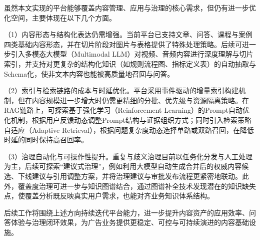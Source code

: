 虽然本文实现的平台能够覆盖内容管理、应用与治理的核心需求，但仍有进一步优化空间，主要体现在以下几个方面。

（1）内容形态与结构化表达仍需增强。当前平台已支持文章、问答、课程与案例四类基础内容形态，并在切片阶段对图片与表格提供了特殊处理策略。后续可进一步引入多模态大模型（Multimodal LLM）对视频、音频内容进行深度理解与切片索引，并支持对更复杂的结构化知识（如规则流程图、指标定义表）的自动抽取与Schema化，使非文本内容也能被高质量地召回与问答。

（2）索引与检索链路的成本与时延优化。平台采用事件驱动的增量索引构建机制，但在内容规模进一步增大时仍需更精细的分批、优先级与资源隔离策略。在RAG链路上，可探索基于强化学习（Reinforcement Learning）的Prompt自动优化机制，根据用户反馈动态调整Prompt结构与证据组织方式；同时引入检索策略自适应（Adaptive Retrieval），根据问题复杂度动态选择单路或双路召回，在降低时延的同时保持高召回率。



（3）治理自动化与可操作性提升。重复与歧义治理目前以任务化分发与人工处理为主，后续可探索“建议式治理”，例如利用大模型自动生成合并后的权威内容候选、下线建议与引用调整方案，并将治理建议与审批发布流程更紧密地联动。此外，覆盖度治理可进一步与知识图谱结合，通过图谱补全技术发现潜在的知识缺失点，使覆盖分析既反映真实用户需求，也能对齐业务知识体系结构。

后续工作将围绕上述方向持续迭代平台能力，进一步提升内容资产的应用效率、问答体验与治理闭环效果，为广告业务提供更稳定、可控与可持续演进的内容基础设施。
